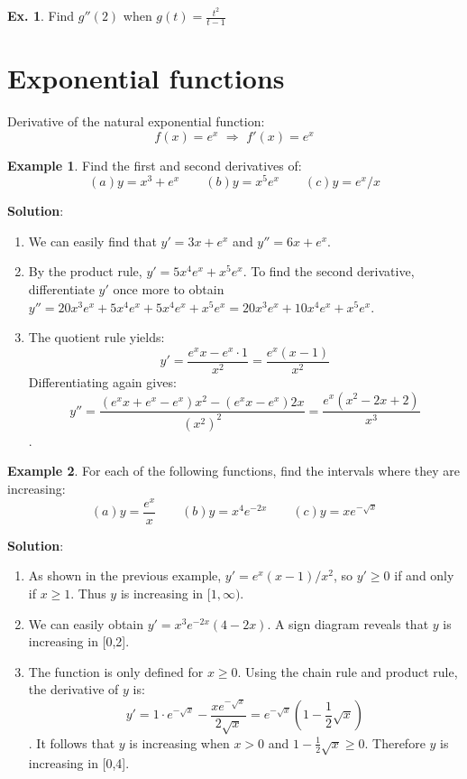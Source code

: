 \documentclass[10pt,a4paper]{book}
\theoremstyle{definition}\newtheorem{definition}{Definition}
\theoremstyle{definition}\newtheorem{fact}{Fact}
\theoremstyle{definition}\newtheorem{ex}{Ex.}
\theoremstyle{definition}\newtheorem{project}{Project}
\theoremstyle{definition}\newtheorem{problem}{Problem}
\theoremstyle{definition}\newtheorem{example}{Example}
\numberwithin{theorem}{chapter}
\numberwithin{corollary}{chapter}
\numberwithin{assumption}{chapter}
\numberwithin{definition}{chapter}
\numberwithin{prop}{chapter}
\numberwithin{notation}{chapter}
\numberwithin{problem}{chapter}
\numberwithin{example}{chapter}
\numberwithin{fact}{chapter}
\numberwithin{ex}{chapter}
\begin{document}
	\begin{ex}
		Find $g''(2)$ when $g(t) = \frac{t^2}{t-1}$
	\end{ex}
	
	\section{Exponential functions}
	
	Derivative of the natural exponential function:
	$$f(x) = e^x \,\, \Rightarrow \,\, f'(x) = e^x$$
	
	\begin{example}
		Find the first and second derivatives of:
		\begin{equation*}
			(a) y=x^3+e^x \qquad
			(b) y=x^5e^x \qquad
			(c) y=e^x/x
		\end{equation*}
		
		\textbf{Solution}:
		\begin{enumerate}[label=(\alph*)]
			\item We can easily find that $y'=3x+e^x$ and $y''=6x+e^x$.
			\item By the product rule, $y'=5x^4 e^x + x^5 e^x$. To find the second derivative, differentiate $y'$ once more to obtain $y''=20x^3e^x+5x^4e^x+5x^4e^x+x^5e^x = 20x^3e^x+10x^4e^x+x^5e^x$.
			\item The quotient rule yields:
			$$y'=\frac{e^xx-e^x \cdot 1}{x^2}=\frac{e^x(x-1)}{x^2}$$
			Differentiating again gives:
			$$y''=\frac{(e^xx+e^x-e^x)x^2-(e^xx-e^x)2x}{(x^2)^2}=\frac{e^x(x^2-2x+2)}{x^3}$$.
		\end{enumerate}
	\end{example}
	
	\begin{example}
		For each of the following functions, find the intervals where they are increasing:
		\begin{equation*}
			(a)y=\frac{e^x}{x} \qquad
			(b)y=x^4e^{-2x} \qquad
			(c)y=xe^{-\sqrt{x}}
		\end{equation*}
		
		\textbf{Solution}:
		\begin{enumerate}[label=(\alph*)]
			\item As shown in the previous example, $y'=e^x(x-1)/x^2$, so $y'\geq 0$ if and only if $x \geq 1$. Thus $y$ is increasing in $[1,\infty)$.
			\item We can easily obtain $y'=x^3e^{-2x}(4-2x)$. A sign diagram reveals that $y$ is increasing in [0,2].
			\item The function is only defined for $x \geq 0$. Using the chain rule and product rule, the derivative of $y$ is:
			$$y'=1\cdot e^{-\sqrt{x}}-\frac{xe^{-\sqrt{x}}}{2\sqrt{x}}=e^{-\sqrt{x}}\left( 1-\frac{1}{2}\sqrt{x} \right)$$.
			It follows that $y$ is increasing when $x > 0$ and $1-\frac{1}{2}\sqrt{x} \geq 0$. Therefore $y$ is increasing in [0,4].
		\end{enumerate}
	\end{example}
	
\end{document}
